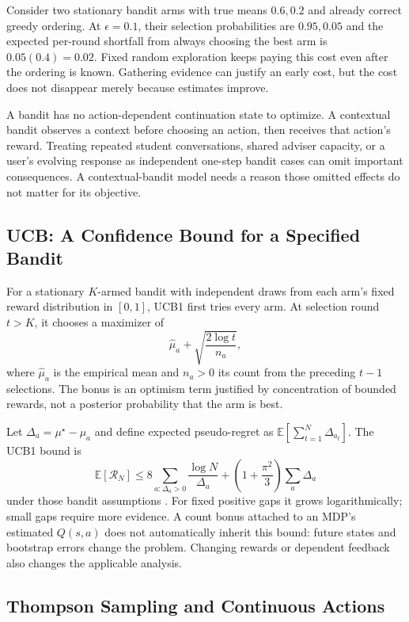 Consider two stationary bandit arms with true means $0.6,0.2$ and already correct greedy ordering. At $\epsilon=0.1$, their selection probabilities are $0.95,0.05$ and the expected per-round shortfall from always choosing the best arm is $0.05(0.4)=0.02$. Fixed random exploration keeps paying this cost even after the ordering is known. Gathering evidence can justify an early cost, but the cost does not disappear merely because estimates improve.

A bandit has no action-dependent continuation state to optimize. A contextual bandit observes a context before choosing an action, then receives that action's reward. Treating repeated student conversations, shared adviser capacity, or a user's evolving response as independent one-step bandit cases can omit important consequences. A contextual-bandit model needs a reason those omitted effects do not matter for its objective.

\subsection{UCB: A Confidence Bound for a Specified Bandit}

For a stationary $K$-armed bandit with independent draws from each arm's fixed reward distribution in $[0,1]$, UCB1 first tries every arm. At selection round $t>K$, it chooses a maximizer of
\[
\hat\mu_a+\sqrt{\frac{2\log t}{n_a}},
\]
where $\hat\mu_a$ is the empirical mean and $n_a>0$ its count from the preceding $t-1$ selections. The bonus is an optimism term justified by concentration of bounded rewards, not a posterior probability that the arm is best.

Let $\Delta_a=\mu^\star-\mu_a$ and define expected pseudo-regret as $\mathbb E[\sum_{t=1}^N\Delta_{a_t}]$. The UCB1 bound is
\[
\mathbb E[\mathcal R_N]\le
8\sum_{a:\Delta_a>0}\frac{\log N}{\Delta_a}
+\left(1+\frac{\pi^2}{3}\right)\sum_a\Delta_a
\]
under those bandit assumptions \citep{auer2002ucb}. For fixed positive gaps it grows logarithmically; small gaps require more evidence. A count bonus attached to an MDP's estimated $Q(s,a)$ does not automatically inherit this bound: future states and bootstrap errors change the problem. Changing rewards or dependent feedback also changes the applicable analysis.

\subsection{Thompson Sampling and Continuous Actions}

